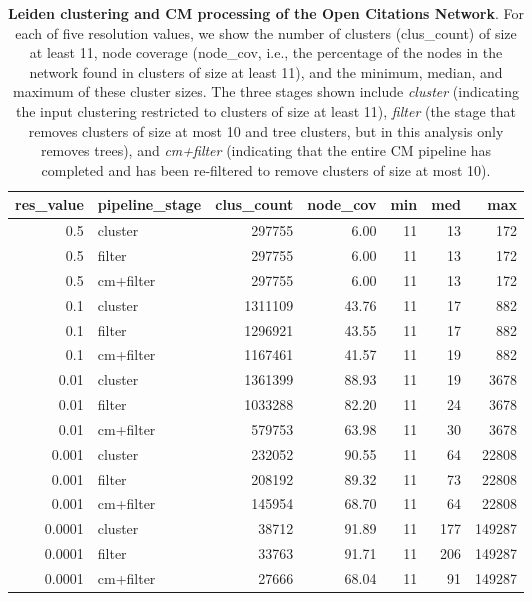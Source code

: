 \documentclass[11pt]{article}   	%
\begin{document}
\begin{table}[ht]
\centering
\begin{tabular}{rlrrrrr}
  \hline
res\_value & pipeline\_stage & clus\_count & node\_cov & min & med & max \\
  \hline
0.5 & cluster & 297755 & 6.00 &    11 & 13 &   172 \\
 0.5 & filter & 297755 & 6.00&    11 & 13 &   172 \\
 0.5 & cm+filter & 297755 & 6.00 &    11 & 13 &   172 \\
 \hline
 0.1 & cluster & 1311109 & 43.76 &    11 & 17 &   882 \\
 0.1 & filter & 1296921 & 43.55 &    11 & 17 &   882 \\
 0.1 & cm+filter & 1167461 & 41.57 &    11 & 19 &   882 \\
 \hline
 0.01 & cluster & 1361399 & 88.93 &    11 & 19 &  3678 \\
 0.01 & filter & 1033288 & 82.20 &    11 & 24 &  3678 \\
 0.01 & cm+filter & 579753 & 63.98 &    11 & 30 &  3678 \\
 \hline
 0.001 & cluster & 232052 & 90.55 &    11 & 64 & 22808 \\
 0.001 & filter & 208192 & 89.32 &    11 & 73 & 22808 \\
 0.001 & cm+filter & 145954 & 68.70 &    11 & 64 & 22808 \\
 \hline
 0.0001 & cluster & 38712 & 91.89 &    11 & 177 & 149287 \\
 0.0001 & filter & 33763 & 91.71 &    11 & 206 & 149287 \\
 0.0001 & cm+filter & 27666 & 68.04 &    11 & 91 & 149287 \\
   \hline
\end{tabular}
\caption{\textbf{Leiden clustering and CM processing of the Open Citations Network}. For each of five resolution values, we show  the number of clusters (clus\_count) of size at least 11, node coverage (node\_cov, i.e., the percentage  of the nodes in the network found in clusters of size at least 11), and the minimum, median, and maximum of these cluster sizes. The three stages shown include  \emph{cluster} (indicating the input clustering restricted to clusters of size at least 11), \emph{filter} (the stage that removes  clusters of size at most 10 and tree clusters, but in this analysis only removes trees), and  \emph{cm+filter} (indicating that the entire CM pipeline has completed and has been re-filtered to remove clusters of size at most 10).}
\label{tab:Leiden-OC-11}
\end{table}
\end{document}
